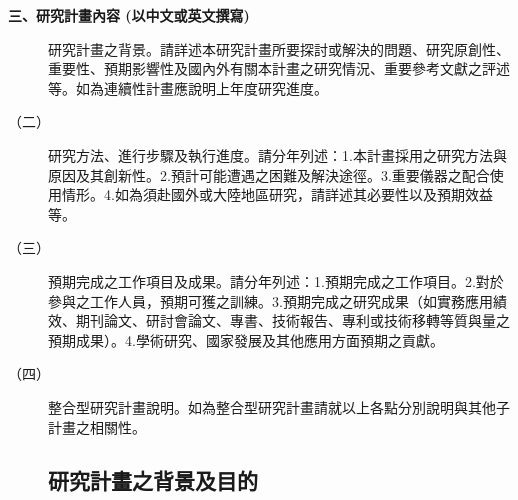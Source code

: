 \documentclass[12pt,a4paper]{article}
\begin{document}
\newtheorem{thm}{Theorem}
\newtheorem{lem}{Lemma}
\newtheorem{cor}{Corollary}
\newtheorem{prop}{Proposition}
\newtheorem{conj}{Conjecture}

\baselineskip 7mm

\noindent
\textbf{\large 三、研究計畫內容 (以中文或英文撰寫)}
\begin{description}
\item[]研究計畫之背景。請詳述本研究計畫所要探討或解決的問題、研究原創性、重要性、預期影響性及國內外有關本計畫之研究情況、重要參考文獻之評述等。如為連續性計畫應說明上年度研究進度。
\item[（二）]研究方法、進行步驟及執行進度。請分年列述：1.本計畫採用之研究方法與原因及其創新性。2.預計可能遭遇之困難及解決途徑。3.重要儀器之配合使用情形。4.如為須赴國外或大陸地區研究，請詳述其必要性以及預期效益等。
\item[（三）]預期完成之工作項目及成果。請分年列述：1.預期完成之工作項目。2.對於參與之工作人員，預期可獲之訓練。3.預期完成之研究成果（如實務應用績效、期刊論文、研討會論文、專書、技術報告、專利或技術移轉等質與量之預期成果）。4.學術研究、國家發展及其他應用方面預期之貢獻。
\item[（四）]整合型研究計畫說明。如為整合型研究計畫請就以上各點分別說明與其他子計畫之相關性。

\setlength\parindent{2em}    %

\setcounter{section}{3}
\setcounter{subsection}{0}

\subsection{研究計畫之背景及目的}

\end{description}
\end{document}
